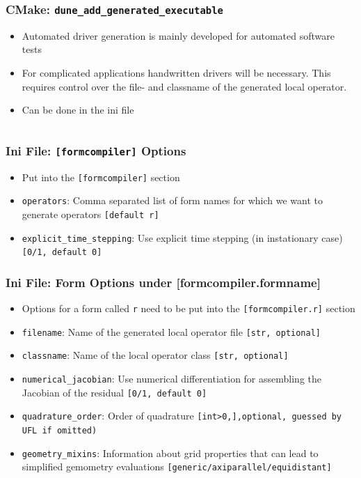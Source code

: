 \documentclass[aspectratio=169,11pt]{beamer}
\theoremstyle{definition}
\begin{document}
\begin{frame}[fragile]
  \frametitle{CMake: \lstinline{dune_add_generated_executable}}

  \begin{itemize}
  \item Automated driver generation is mainly developed for automated software
    tests
  \item For complicated applications handwritten drivers will be
    necessary. This requires control over the file- and classname of the
    generated local operator.
  \item Can be done in the ini file \vspace{0.3cm}
    \inputminted[fontsize=\scriptsize]{ini}{classname_filename.ini}
  \end{itemize}
\end{frame}

\begin{frame}[fragile]
  \frametitle{Ini File: \lstinline{[formcompiler]} Options}

  \begin{itemize}
    \item Put into the \lstinline{[formcompiler]} section
  \item \lstinline{operators}: Comma separated list of form names for which we
    want to generate operators \lstinline{[default r]}
  \item \lstinline{explicit_time_stepping}: Use explicit time stepping (in
    instationary case) \lstinline{[0/1, default 0]}
  \end{itemize}
\end{frame}

\begin{frame}[fragile]
  \frametitle{Ini File: Form Options under [formcompiler.formname]}

  \begin{itemize}
  \item Options for a form called \lstinline{r} need to be put into the
    \lstinline{[formcompiler.r]} section
  \item \lstinline{filename}: Name of the generated local
    operator file \lstinline{[str, optional]}
  \item \lstinline{classname}: Name of the local operator class
    \lstinline{[str, optional]}
  \item \lstinline{numerical_jacobian}: Use numerical differentiation for
    assembling the Jacobian of the residual \lstinline{[0/1, default 0]}
  \item \lstinline{quadrature_order}: Order of quadrature \lstinline[language={}]{[int>0,],optional, guessed by UFL if omitted)}
  \item \lstinline{geometry_mixins}: Information about grid properties that can
    lead to simplified gemometry evaluations
    \lstinline{[generic/axiparallel/equidistant]}
  \end{itemize}
\end{frame}
\end{document}
